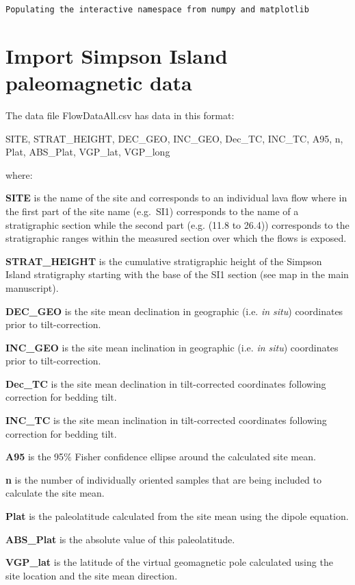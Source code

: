 \documentclass{article}
\begin{document}
    \begin{Verbatim}[commandchars=\\\{\}]
Populating the interactive namespace from numpy and matplotlib
    \end{Verbatim}


    \section{Import Simpson Island paleomagnetic data}


    The data file FlowDataAll.csv has data in this format:

SITE, STRAT\_HEIGHT, DEC\_GEO, INC\_GEO, Dec\_TC, INC\_TC, A95, n, Plat,
ABS\_Plat, VGP\_lat, VGP\_long

where:

\textbf{SITE} is the name of the site and corresponds to an individual
lava flow where in the first part of the site name (e.g.~SI1)
corresponds to the name of a stratigraphic section while the second part
(e.g. (11.8 to 26.4)) corresponds to the stratigraphic ranges within the
measured section over which the flows is exposed.

\textbf{STRAT\_HEIGHT} is the cumulative stratigraphic height of the
Simpson Island stratigraphy starting with the base of the SI1 section
(see map in the main manuscript).

\textbf{DEC\_GEO} is the site mean declination in geographic (i.e.
\emph{in situ}) coordinates prior to tilt-correction.

\textbf{INC\_GEO} is the site mean inclination in geographic (i.e.
\emph{in situ}) coordinates prior to tilt-correction.

\textbf{Dec\_TC} is the site mean declination in tilt-corrected
coordinates following correction for bedding tilt.

\textbf{INC\_TC} is the site mean inclination in tilt-corrected
coordinates following correction for bedding tilt.

\textbf{A95} is the 95$\%$ Fisher confidence ellipse around the
calculated site mean.

\textbf{n} is the number of individually oriented samples that are being
included to calculate the site mean.

\textbf{Plat} is the paleolatitude calculated from the site mean using
the dipole equation.

\textbf{ABS\_Plat} is the absolute value of this paleolatitude.

\textbf{VGP\_lat} is the latitude of the virtual geomagnetic pole
calculated using the site location and the site mean direction.
\end{document}
